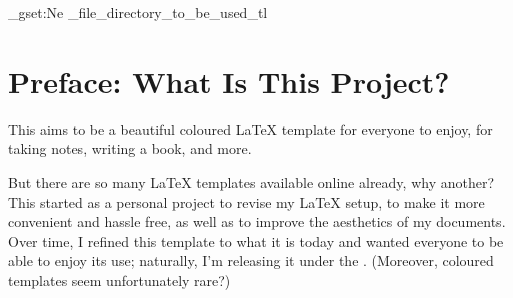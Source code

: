\documentclass[11pt, a4paper]{book}
\begin{document}
\ExplSyntaxOn
    \tl_gset:Ne \g_file_directory_to_be_used_tl {}
\ExplSyntaxOff
\frontmatter
{}
\thispagestyle{empty} 
%
\chapter{Preface: What Is This Project?}
This aims to be a beautiful coloured {\LaTeX} template for everyone to enjoy, for taking notes, writing a book, and more. 

But there are so many {\LaTeX} templates available online already, why another? This started as a personal project to revise my {\LaTeX} setup, to make it more convenient and hassle free, as well as to improve the aesthetics of my documents. Over time, I refined this template to what it is today and wanted everyone to be able to enjoy its use; naturally, I'm releasing it under the . (Moreover, coloured templates seem unfortunately rare?)
\end{document}
